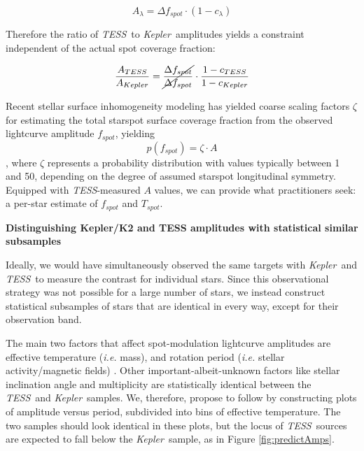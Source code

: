 \documentclass[letterpaper,11pt]{article}
\newcommand{\tess}{{\it TESS}}
\newcommand{\kepler}{{\it Kepler}}
\begin{document}
$$ A_\lambda = \Delta f_{spot} \cdot (1-c_\lambda)$$

Therefore the ratio of \tess\ to \kepler\ amplitudes yields a constraint independent of the actual spot coverage fraction:

$$ \frac{A_{TESS}}{A_{Kepler}} = \cancel{\frac{\Delta f_{spot}}{\Delta f_{spot}}} \cdot \frac{1-c_{TESS}}{1-c_{Kepler}} $$

Recent stellar surface inhomogeneity modeling \citep{2018ApJ...853..122R, 2018ApJ...868..143G, 2018ApJ...865..142B} has yielded coarse scaling factors $\zeta$ for estimating the total starspot surface coverage fraction from the observed lightcurve amplitude $f_{spot}$, yielding $$ p(f_{spot}) = \zeta \cdot A $$, where $\zeta$ represents a probability distribution with values typically between 1 and 50, depending on the degree of assumed starspot longitudinal symmetry.  Equipped with \tess-measured $A$ values, we can provide what practitioners seek: a per-star estimate of $f_{spot}$ and $T_{spot}$.

\textbf{Distinguishing Kepler/K2 and TESS amplitudes with statistical similar subsamples}

Ideally, we would have simultaneously observed the same targets with \kepler\ and \tess\ to measure the contrast for individual stars.  Since this observational strategy was not possible for a large number of stars, we instead construct statistical subsamples of stars that are identical in every way, except for their observation band.

The main two factors that affect spot-modulation lightcurve amplitudes are effective temperature (\emph{i.e.} mass), and rotation period (\emph{i.e.} stellar activity/magnetic fields) \citep{2014ApJS..211...24M}.  Other important-albeit-unknown factors like stellar inclination angle and multiplicity are statistically identical between the \tess\ and \kepler\ samples.  We, therefore, propose to follow \citet{2014ApJS..211...24M} by constructing plots of amplitude versus period, subdivided into bins of effective temperature.  The two samples should look identical in these plots, but the locus of \tess\ sources are expected to fall below the \kepler\ sample, as in Figure \ref{fig:predictAmps}.
\end{document}
